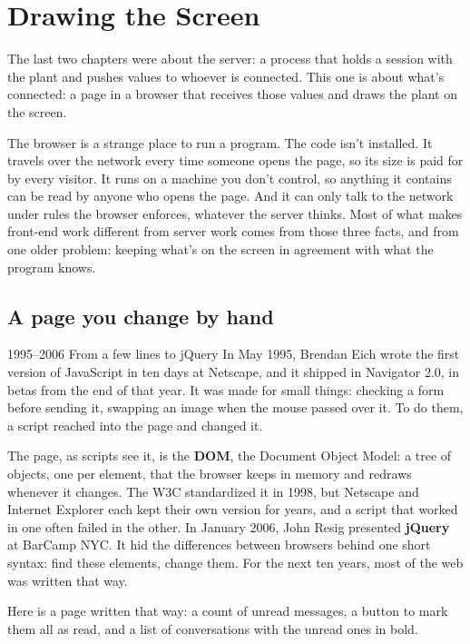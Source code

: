 \chapter{Drawing the Screen}

The last two chapters were about the server: a process that holds a session
with the plant and pushes values to whoever is connected. This one is about
what's connected: a page in a browser that receives those values and draws the
plant on the screen.

The browser is a strange place to run a program. The code isn't installed. It
travels over the network every time someone opens the page, so its size is paid
for by every visitor. It runs on a machine you don't control, so anything it
contains can be read by anyone who opens the page. And it can only talk to the
network under rules the browser enforces, whatever the server thinks. Most of
what makes front-end work different from server work comes from those three
facts, and from one older problem: keeping what's on the screen in agreement
with what the program knows.

\section{A page you change by hand}
\label{sec:by-hand}

\begin{history}{1995--2006 \textperiodcentered{} From a few lines to jQuery}
In May 1995, Brendan Eich wrote the first version of JavaScript in ten days at
Netscape, and it shipped in Navigator 2.0, in betas from the end of that year. It was made for small
things: checking a form before sending it, swapping an image when the mouse
passed over it. To do them, a script reached into the page and changed it.

The page, as scripts see it, is the \textbf{DOM}, the Document Object Model: a
tree of objects, one per element, that the browser keeps in memory and redraws
whenever it changes. The W3C standardized it in 1998, but Netscape and Internet
Explorer each kept their own version for years, and a script that worked in one
often failed in the other. In January 2006, John Resig presented
\textbf{jQuery} at BarCamp NYC. It hid the differences between browsers behind
one short syntax: find these elements, change them. For the next ten years,
most of the web was written that way.
\end{history}

Here is a page written that way: a count of unread messages, a button to mark
them all as read, and a list of conversations with the unread ones in bold.

